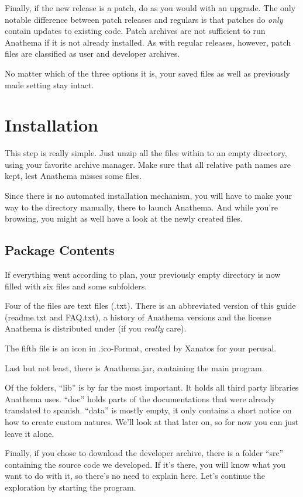 Finally, if the new release is a patch, do as you would with an upgrade. The only notable difference between patch releases and regulars is that patches do \emph{only} contain updates to existing code. Patch archives are not sufficient to run Anathema if it is not already installed. As with regular releases, however, patch files are classified as user and developer archives.

No matter which of the three options it is, your saved files as well as previously made setting stay intact.

\section{Installation}
This step is really simple. Just unzip all the files within to an empty directory, using your favorite archive manager. Make sure that all relative path names are kept, lest Anathema misses some files.

Since there is no automated installation mechanism, you will have to make your way to the directory manually, there to launch Anathema. And while you're browsing, you might as well have a look at the newly created files.

\subsection{Package Contents}\label{sub:PackageContents}
If everything went according to plan, your previously empty directory is now
filled with six files and some subfolders. 

Four of the files are text files (.txt). There is an abbreviated version of this guide (readme.txt and FAQ.txt), a history of Anathema versions and the license Anathema is distributed under (if you \emph{really} care).

The fifth file is an icon in .ico-Format, created by Xanatos for your perusal. 

Last but not least, there is Anathema.jar, containing the main program.

Of the folders, ``lib'' is by far the most important. It holds all third party libraries Anathema uses. ``doc'' holds parts of the documentations that were already translated to spanish. ``data'' is mostly empty, it only contains a short notice on how to create custom natures. We'll look at that later on, so for now you can just leave it alone. 

Finally, if you chose to download the developer archive, there is a folder ``src'' containing the source code we developed.
If it's there, you will know what you want to do with it, so there's no need to explain here.
\medskip
\newline
Let's continue the exploration by starting the program.

